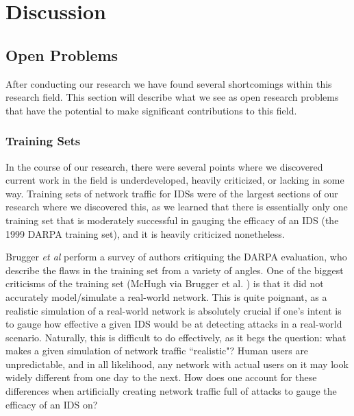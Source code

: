 \documentclass{acm_proc_article-sp}
\begin{document}
\section{Discussion}
    
    \subsection{Open Problems}
    After conducting our research we have found several shortcomings within this research field. This section will describe what we see as open research problems that have the potential to make significant contributions to this field.
    	\subsubsection{Training Sets} \label{trainingSets}
    	In the course of our research, there were several points where we discovered current work in the field is underdeveloped, heavily criticized, or lacking in some way. Training sets of network traffic for IDSs were of the largest sections of our research where we discovered this, as we learned that there is essentially only one training set that is moderately successful in gauging the efficacy of an IDS (the 1999 DARPA training set), and it is heavily criticized nonetheless. 
    	
    	Brugger \emph{et al} \cite{Brugger2007} perform a survey of authors critiquing the DARPA evaluation, who describe the flaws in the training set from a variety of angles. One of the biggest criticisms of the training set (McHugh via Brugger et al. \cite{Brugger2007}) is that it did not accurately model/simulate a real-world network. This is quite poignant, as a realistic simulation of a real-world network is absolutely crucial if one's intent is to gauge how effective a given IDS would be at detecting attacks in a real-world scenario. Naturally, this is difficult to do effectively, as it begs the question: what makes a given simulation of network traffic ``realistic"? Human users are unpredictable, and in all likelihood, any network with actual users on it may look widely different from one day to the next. How does one account for these differences when artificially creating network traffic full of attacks to gauge the efficacy of an IDS on? 
    	
\end{document}
